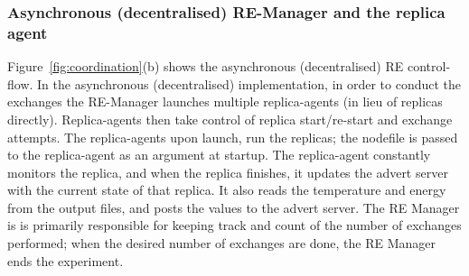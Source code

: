 \documentclass{rspublic}
\newcommand{\jhanote}[1]{ {\textcolor{red} { ***shantenu: #1 }}}
\newcommand{\alnote}[1]{ {\textcolor{blue} { ***andre: #1 }}}
\newcommand{\alnote}[1]{}
\newcommand{\jhanote}[1]{}
\begin{document}
\subsubsection{Asynchronous (decentralised) RE-Manager and the replica agent}

 

Figure~\ref{fig:coordination}(b) shows the asynchronous (decentralised)
RE control-flow.  In the asynchronous (decentralised) implementation,
in order to conduct the exchanges the RE-Manager launches multiple
replica-agents (in lieu of replicas directly).  Replica-agents then
take control of replica start/re-start and exchange attempts.  The
replica-agents upon launch, run the replicas; the nodefile is passed
to the replica-agent as an argument at startup. The replica-agent
constantly monitors the replica, and when the replica finishes, it
updates the advert server with the current state of that replica.  It
also reads the temperature and energy from the output files, and posts
the values to the advert server.  The RE Manager is is primarily
responsible for keeping track and count of the number of exchanges
performed; when the desired number of exchanges are done, the RE
Manager ends the experiment.

  

\end{document}
